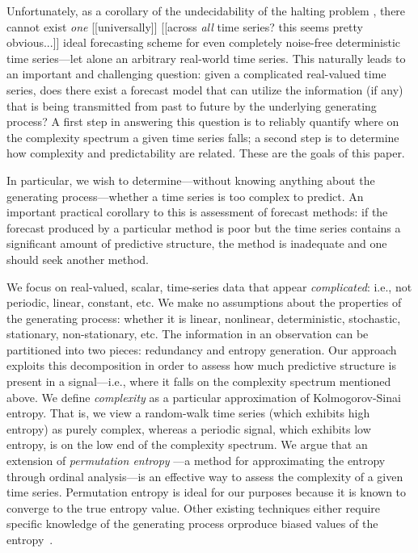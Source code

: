 Unfortunately, as a corollary of the undecidability of the halting
problem \cite{halting-problem}, there cannot exist \emph{one}
[[universally]] [[across {\sl all} time series?  this seems pretty
    obvious...]] ideal forecasting scheme for even completely
noise-free deterministic time series\cite{weigend-book}---let alone an
arbitrary real-world time series.  This naturally leads to an
important and challenging question: given a complicated real-valued
time series, does there exist a forecast model that can utilize the
information (if any) that is being transmitted from past to future by
the underlying generating process?  A first step in answering this
question is to reliably quantify where on the complexity spectrum a
given time series falls; a second step is to determine how complexity
and predictability are related.  These are the goals of this paper.

In particular, we wish to determine---without knowing anything about
the generating process---whether a time series is too complex to
predict.  An important practical corollary to this is assessment of
forecast methods: if the forecast produced by a particular method is
poor but the time series contains a significant amount of predictive
structure, the method is inadequate and one should seek another
method.  

We focus on real-valued, scalar, time-series data that appear
\emph{complicated}: i.e., not periodic, linear, constant, etc.  We
make no assumptions about the properties of the generating process:
whether it is linear, nonlinear, deterministic, stochastic,
stationary, non-stationary, etc.  The information in an observation
can be partitioned into two pieces: redundancy and entropy
generation\cite{crutchfield2003}.  Our approach exploits this
decomposition in order to assess how much predictive structure is
present in a signal---i.e., where it falls on the complexity spectrum
mentioned above.  We define \emph{complexity} as a particular
approximation of Kolmogorov-Sinai entropy\cite{KS-entropy}.  That is,
we view a random-walk time series (which exhibits high entropy) as
purely complex, whereas a periodic signal, which exhibits low entropy,
is on the low end of the complexity spectrum.  We argue that an
extension of \emph{permutation entropy} \cite{bandt2002per}---a method
for approximating the entropy through ordinal analysis---is an
effective way to assess the complexity of a given time series.
Permutation entropy is ideal for our purposes because it is known to
converge to the true entropy value. Other existing techniques either require specific knowledge of the generating process orproduce biased values of the entropy~\cite{bollt2001}.


